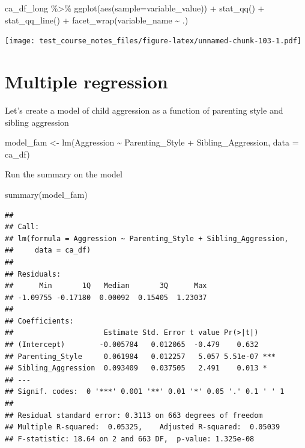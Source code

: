 \documentclass[
]{book}
\newenvironment{Shaded}{\begin{snugshade}}{\end{snugshade}}
\newcommand{\AttributeTok}[1]{\textcolor[rgb]{0.77,0.63,0.00}{#1}}
\newcommand{\FunctionTok}[1]{\textcolor[rgb]{0.00,0.00,0.00}{#1}}
\newcommand{\NormalTok}[1]{#1}
\newcommand{\OtherTok}[1]{\textcolor[rgb]{0.56,0.35,0.01}{#1}}
\newcommand{\SpecialCharTok}[1]{\textcolor[rgb]{0.00,0.00,0.00}{#1}}
\begin{document}
\begin{Shaded}
\begin{Highlighting}[]
\NormalTok{ca\_df\_long }\SpecialCharTok{\%\textgreater{}\%} 
  \FunctionTok{ggplot}\NormalTok{(}\FunctionTok{aes}\NormalTok{(}\AttributeTok{sample=}\NormalTok{variable\_value)) }\SpecialCharTok{+}
  \FunctionTok{stat\_qq}\NormalTok{() }\SpecialCharTok{+}
  \FunctionTok{stat\_qq\_line}\NormalTok{() }\SpecialCharTok{+}
  \FunctionTok{facet\_wrap}\NormalTok{(variable\_name }\SpecialCharTok{\textasciitilde{}}\NormalTok{ .)}
\end{Highlighting}
\end{Shaded}

\texttt{[image: test\_course\_notes\_files/figure-latex/unnamed-chunk-103-1.pdf]}

\hypertarget{multiple-regression}{%
\section{Multiple regression}\label{multiple-regression}}

Let's create a model of child aggression as a function of parenting style and sibling aggression

\begin{Shaded}
\begin{Highlighting}[]
\NormalTok{model\_fam }\OtherTok{\textless{}{-}} \FunctionTok{lm}\NormalTok{(Aggression }\SpecialCharTok{\textasciitilde{}}\NormalTok{ Parenting\_Style }\SpecialCharTok{+}\NormalTok{ Sibling\_Aggression, }\AttributeTok{data =}\NormalTok{ ca\_df)}
\end{Highlighting}
\end{Shaded}

Run the summary on the model

\begin{Shaded}
\begin{Highlighting}[]
\FunctionTok{summary}\NormalTok{(model\_fam)}
\end{Highlighting}
\end{Shaded}

\begin{verbatim}
## 
## Call:
## lm(formula = Aggression ~ Parenting_Style + Sibling_Aggression, 
##     data = ca_df)
## 
## Residuals:
##      Min       1Q   Median       3Q      Max 
## -1.09755 -0.17180  0.00092  0.15405  1.23037 
## 
## Coefficients:
##                     Estimate Std. Error t value Pr(>|t|)    
## (Intercept)        -0.005784   0.012065  -0.479    0.632    
## Parenting_Style     0.061984   0.012257   5.057 5.51e-07 ***
## Sibling_Aggression  0.093409   0.037505   2.491    0.013 *  
## ---
## Signif. codes:  0 '***' 0.001 '**' 0.01 '*' 0.05 '.' 0.1 ' ' 1
## 
## Residual standard error: 0.3113 on 663 degrees of freedom
## Multiple R-squared:  0.05325,    Adjusted R-squared:  0.05039 
## F-statistic: 18.64 on 2 and 663 DF,  p-value: 1.325e-08
\end{verbatim}
\end{document}
